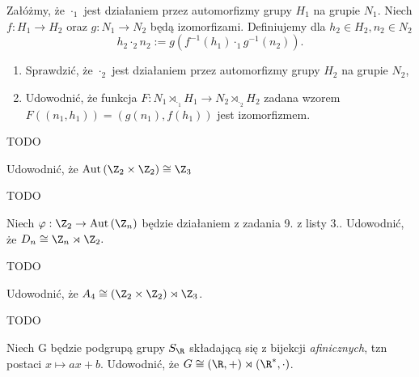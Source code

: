 \begin{problem}[2]
	
	Załóżmy, że $\cdot _{1}$ jest działaniem przez automorfizmy grupy $H_1$ na grupie $N_1$. Niech $f: H_1\rightarrow H_2$ oraz $g: N_1\rightarrow N_2$ będą izomorfizami. Definiujemy dla $h_2\in H_2, n_2 \in N_2$
	\[
	h_2 \cdot _{2} n_2 :=g\left( f^{-1}\left( h_1 \right) \cdot_{1}g^{-1}\left( n_2 \right)  \right) 
	.\] 
	\begin{enumerate}[label=\alph*)]
		\item Sprawdzić, że $\cdot _{2}$ jest działaniem przez automorfizmy grupy $H_2$ na grupie $N_2$,
		\item Udowodnić, że funkcja $F: N_1 \rtimes_{\cdot _{1}}H_1 \rightarrow N_2\rtimes_{\cdot _{2}} H_2$ zadana wzorem $F\left( \left( n_1,h_1 \right)  \right) = \left( g\left( n_1 \right) , f\left( h_1 \right)  \right) $ jest izomorfizmem.
	\end{enumerate}
\end{problem} 
\begin{solution}
	
	TODO
\end{solution} 
\begin{problem}[3]
	
	Udowodnić, że $\text{Aut}\left( \Z_2\times \Z_2 \right) \cong \Z_3$
\end{problem} 
\begin{solution}
	
	TODO
\end{solution} 
\begin{problem}[4]
	
	Niech $\varphi: \Z_2\rightarrow \text{Aut}\left( \Z_{n} \right) $ będzie działaniem z zadania 9. z listy 3.. Udowodnić, że $D_{n}\cong \Z_{n}\rtimes \Z_2.$
\end{problem} 
\begin{solution}
	
	TODO
\end{solution} 
\begin{problem}[5]
	
	Udowodnić, że $A_4 \cong \left( \Z_2\times \Z_2 \right) \rtimes \Z_3$.
\end{problem} 
\begin{solution}
	
	TODO
\end{solution} 
\begin{problem}[6]
	
	Niech G będzie podgrupą grupy $S_{\R}$ składającą się z bijekcji \textit{afinicznych}, tzn postaci $x \mapsto ax+b $. Udowodnić, że $G\cong\left( \R,+ \right) \rtimes \left( \R^{*},\cdot  \right) $.
\end{problem} 
